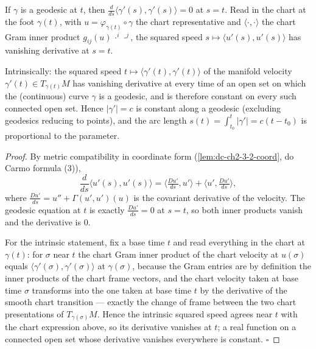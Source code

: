 \begin{lemma}
  \label{lem:dc-ch3-2-1-constspeed}
  \leanok
  If $\gamma$ is a geodesic at $t$, then
  $\frac{d}{ds}\big\langle\gamma'(s),\gamma'(s)\big\rangle=0$ at $s=t$. Read in
  the chart at the foot $\gamma(t)$, with $u=\varphi_{\gamma(t)}\circ\gamma$ the
  chart representative and $\langle\cdot,\cdot\rangle$ the chart Gram inner
  product $g_{ij}(u)\,\cdot^i\,\cdot^j$, the squared speed
  $s\mapsto\langle u'(s),u'(s)\rangle$ has vanishing derivative at $s=t$.

  Intrinsically: the squared speed
  $t\mapsto\langle\gamma'(t),\gamma'(t)\rangle$ of the manifold velocity
  $\gamma'(t)\in T_{\gamma(t)}M$ has vanishing derivative at every time of an
  open set on which the (continuous) curve $\gamma$ is a geodesic, and is
  therefore constant on every such connected open set. Hence $|\gamma'|=c$ is
  constant along a geodesic (excluding geodesics reducing to points), and the
  arc length $s(t)=\int_{t_0}^t|\gamma'|=c(t-t_0)$ is proportional to the
  parameter.
\end{lemma}
\begin{proof}
  \leanok
  By metric compatibility in coordinate form
  (\cref{lem:dc-ch2-3-2-coord}, do Carmo formula (3)),
  $$
  \frac{d}{ds}\big\langle u'(s),u'(s)\big\rangle
    =\Big\langle\tfrac{Du'}{ds},u'\Big\rangle+\Big\langle u',\tfrac{Du'}{ds}\Big\rangle,
  $$
  where $\frac{Du'}{ds}=u''+\Gamma(u',u')(u)$ is the covariant derivative of the
  velocity. The geodesic equation at $t$ is exactly $\frac{Du'}{ds}=0$ at $s=t$,
  so both inner products vanish and the derivative is $0$.

  For the intrinsic statement, fix a base time $t$ and read everything in the
  chart at $\gamma(t)$: for $\sigma$ near $t$ the chart Gram inner product of
  the chart velocity at $u(\sigma)$ equals
  $\langle\gamma'(\sigma),\gamma'(\sigma)\rangle$ at $\gamma(\sigma)$, because
  the Gram entries are by definition the inner products of the chart frame
  vectors, and the chart velocity taken at base time $\sigma$ transforms into
  the one taken at base time $t$ by the derivative of the smooth chart
  transition — exactly the change of frame between the two chart
  presentations of $T_{\gamma(\sigma)}M$. Hence the intrinsic squared speed
  agrees near $t$ with the chart expression above, so its derivative vanishes
  at $t$; a real function on a connected open set whose derivative vanishes
  everywhere is constant. $\square$
\end{proof}

